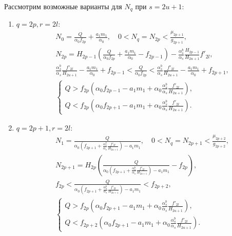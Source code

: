 Рассмотрим возможные варианты для \(N_q\) при \(s=2u+1\):
\begin{enumerate}[leftmargin=10pt,itemindent=26pt]
    \item \(q = 2p, r = 2l\):
    \begin{align*}
        & N_0 = \frac{Q}{\alpha_0 f_{2p} } + \frac{a_1 m_1}{\alpha_0}, \quad 0 < N_q = N_{2p} < \frac{\mu_{2p+1}}{g_{2p+1}}, \\
        & N_{2p} = H_{2p-1} \left( \frac{Q}{\alpha_0 f_{2p} } + \frac{a_1 m_1}{\alpha_0} - f_{2p-1} \right) - \frac{\alpha^b_s}{\alpha_s} \frac{H_{2p-1}}{H_{2u+1}} f'_{2l}, \\
        & \frac{\alpha^b_s}{\alpha_s} \frac{f'_{2l}}{H_{2u+1}} - \frac{a_1 m_1}{\alpha_0} + f_{2p-1} < \frac{Q}{\alpha_0 f_{2p} } < \frac{\alpha^b_s}{\alpha_s} \frac{f'_{2l}}{H_{2u+1}} - \frac{a_1 m_1}{\alpha_0} + f_{2p+1}, \\
        & \begin{cases}
            Q > f_{2p} \left( \alpha_0 f_{2p-1} - a_1 m_1 + \alpha_0 \frac{\alpha^b_s}{\alpha_s} \frac{f'_{2l}}{H_{2u+1}} \right), \\
            Q < f_{2p} \left( \alpha_0 f_{2p+1} - a_1 m_1 + \alpha_0 \frac{\alpha^b_s}{\alpha_s} \frac{f'_{2l}}{H_{2u+1}} \right).
        \end{cases}
    \end{align*}

    \item \(q = 2p+1, r = 2l\):
    \begin{align*}
        & N_1 = \frac{Q}{\alpha_0 \left( f_{2p+1} + \frac{\alpha^b_s}{\alpha_s} \frac{f'_{2l}}{H_{2u+1}} \right) - a_1 m_1}, \quad 0 < N_{q} = N_{2p+1}< \frac{\mu_{2p+2}}{g_{2p+2}}, \\
        & N_{2p+1} = H_{2p} \left( \frac{Q}{\alpha_0 \left( f_{2p+1} + \frac{\alpha^b_s}{\alpha_s} \frac{f'_{2l}}{H_{2u+1}} \right) - a_1 m_1} - f_{2p} \right), \\
        & f_{2p} < \frac{Q}{\alpha_0 \left( f_{2p+1} + \frac{\alpha^b_s}{\alpha_s} \frac{f'_{2l}}{H_{2u+1}} \right) - a_1 m_1} < f_{2p+2}, \\
        & \begin{cases}
            Q > f_{2p} \left( \alpha_0 f_{2p+1} - a_1 m_1 + \alpha_0 \frac{\alpha^b_s}{\alpha_s} \frac{f'_{2l}}{H_{2u+1}} \right), \\
            Q < f_{2p+2} \left( \alpha_0 f_{2p+1} - a_1 m_1 + \alpha_0 \frac{\alpha^b_s}{\alpha_s} \frac{f'_{2l}}{H_{2u+1}} \right).
        \end{cases}
    \end{align*}


\end{enumerate}

